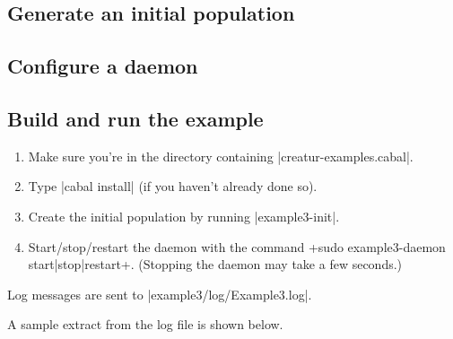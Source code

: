 \documentclass[a4paper,10pt]{article}
\begin{document}
\subsection{Generate an initial population}
\label{sec:pop3}



\subsection{Configure a daemon}
\label{sec:daemon3}



\subsection{Build and run the example}
\label{sec:run3}

\begin{enumerate}
\item Make sure you're in the directory containing |creatur-examples.cabal|.
\item Type |cabal install| (if you haven't already done so).
\item Create the initial population by running |example3-init|.
\item Start/stop/restart the daemon with the command
\UndefineShortVerb{\|}
\DefineShortVerb{\+}
+sudo example3-daemon start|stop|restart+.
\UndefineShortVerb{\+}
\DefineShortVerb{\|}
(Stopping the daemon may take a few seconds.)
\end{enumerate}

Log messages are sent to |example3/log/Example3.log|.

A sample extract from the log file is shown below.
\end{document}
